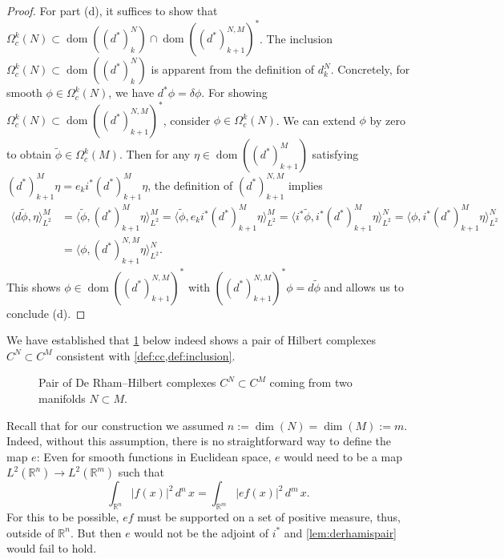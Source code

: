 \documentclass[11pt]{article}
\theoremstyle{definition}
\theoremstyle{remark}
\DeclareMathOperator\dom{dom}
\newcommand{\R}{\mathbb{R}}
\begin{document}
\begin{proof}
    For part (d), it suffices to show that $\Omega_c^k(N) \subset \dom((d^*)_k^N) \cap \dom((d^*)_{k+1}^{N,M})^*$. 
    The inclusion $\Omega_c^k(N) \subset \dom((d^*)_k^N)$ is apparent from the definition of $d_k^N$. Concretely, for smooth $\phi \in \Omega_c^k(N)$, we have $d^* \phi = \delta \phi$. For showing $\Omega_c^k(N) \subset \dom((d^*)_{k+1}^{N,M})^*$, consider $\phi \in \Omega_c^k(N)$. We can extend $\phi$ by zero to obtain $\tilde \phi \in \Omega_c^k(M)$.
    Then for any $\eta \in \dom((d^*)_{k+1}^M)$ satisfying $(d^*)_{k+1}^M\eta= e_k i^* (d^*)_{k+1}^M\eta$, the definition of $(d^*)_{k+1}^{N,M}$ implies
    \begin{align*}
        \langle d \tilde \phi, \eta \rangle_{L^2}^M &= \langle  \tilde \phi, (d^*)_{k+1}^M \eta \rangle_{L^2}^M = \langle  \tilde \phi, e_k i^* (d^*)_{k+1}^M\eta \rangle_{L^2}^M = \langle  i^* \tilde \phi, i^* (d^*)_{k+1}^M\eta \rangle_{L^2}^N = \langle \phi, i^* (d^*)_{k+1}^M \eta \rangle_{L^2}^N \\
        &= \langle \phi, (d^*)_{k+1}^{N,M} \eta \rangle_{L^2}^N.
    \end{align*}
    This shows $\phi \in \dom((d^*)_{k+1}^{N,M})^*$ with $((d^*)_{k+1}^{N,M})^* \phi = d \tilde \phi$ and allows us to conclude (d).
\end{proof}

We have established that \cref{fig:pairofmf} below indeed shows a pair of Hilbert complexes $C^N \subset C^M$ consistent with \cref{def:cc,def:inclusion}.

\begin{figure}[H]
    \centering
    \caption{Pair of De Rham--Hilbert complexes $C^N \subset C^M$  coming from two manifolds $N \subset M$.}
    \label{fig:pairofmf}
\end{figure}
Recall that for our construction we assumed $n:=\dim(N)=\dim(M):=m$. Indeed, without this assumption, there is no straightforward way to define the map $e$: Even for smooth functions in Euclidean space, $e$ would need to be a map $L^2(\R^n) \rightarrow L^2(\R^m)$ such that 
$$
\int_{\R^n} |f(x)|^2 \, d^n \,x= \int_{\R^m} |ef(x)|^2 \, d^m \,x.
$$
For this to be possible, $ef$ must be supported on a set of positive measure, thus, outside of $\R^n$. But then $e$ would not be the adjoint of $i^*$ and \cref{lem:derhamispair} would fail to hold.
\end{document}
